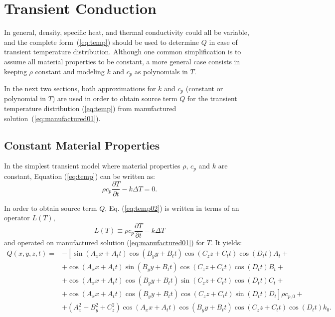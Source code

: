 \documentclass[a4paper,10pt]{article}
\newcommand{\D}{\partial}
\begin{document}
\section{Transient Conduction}

In general, density, specific heat, and thermal conductivity could all be variable, and the complete
form~(\ref{eq:temp}) should be used to determine $Q$ in case of transient temperature distribution. Although one common simplification is to assume all material properties to be constant, a more general case consists in keeping $\rho$ constant and modeling  $k$ and $c_p$  as polynomials in $T$.

In the next two sections, both approximations for $k$ and $c_p$ (constant or polynomial in $T$) are used in order to obtain source term $Q$ for the transient temperature distribution (\ref{eq:temp}) from manufactured solution~(\ref{eq:manufactured01}).

 
\subsection{Constant Material Properties}
In the simplest transient model where  material properties $\rho,\,c_p$ and $k$ are constant, Equation (\ref{eq:temp}) can be written as:
\begin{equation}
 \label{eq:temp02}
\rho c_p \frac{\D T}{\D t} - k \Delta  T = 0.
\end{equation}
 
In order to obtain source term $Q$, Eq. (\ref{eq:temp02}) is written in terms of an operator $L(T)$,
\begin{equation}
\label{eq:L_transient_const}
  L(T)\equiv \rho c_p \frac{\D T}{\D t} - k \Delta  T
\end{equation}
and operated on manufactured solution (\ref{eq:manufactured01}) for $T$. It yields:
\begin{equation}
\begin{split}
Q (x,y,z,t) = &-\left[\sin(A_x x+A_t t) \cos(B_y y+B_t t) \cos(C_z z+C_t t) \cos(D_t t) A_t+\right.\\
    &+\cos(A_x x+A_t t) \sin(B_y y+B_t t) \cos(C_z z+C_t t) \cos(D_t t) B_t+\\
    &+\cos(A_x x+A_t t) \cos(B_y y+B_t t) \sin(C_z z+C_t t) \cos(D_t t) C_t+\\
    &+\left.\cos(A_x x+A_t t) \cos(B_y y+B_t t) \cos(C_z z+C_t t) \sin(D_t t) D_t\right] \rho c_{p,0}+\\
    &+(A_x^2+B_y^2+C_z^2) \cos(A_x x+A_t t) \cos(B_y y+B_t t) \cos(C_z z+C_t t) \cos(D_t t) k_0.
\end{split}
\end{equation}
\end{document}
